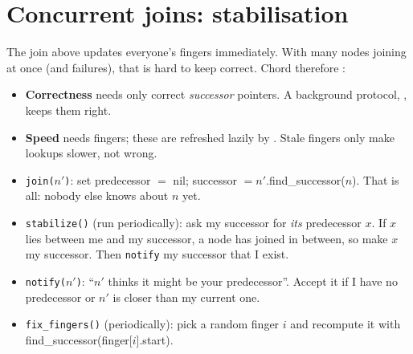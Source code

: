 \section{Concurrent joins: stabilisation}

The join above updates everyone's fingers immediately. With many nodes joining at once (and failures), that is hard to keep correct. Chord
therefore :
\begin{itemize}
  \item \textbf{Correctness} needs only correct \emph{successor} pointers. A background protocol, , keeps them right.
  \item \textbf{Speed} needs fingers; these are refreshed lazily by . Stale fingers only make lookups slower, not wrong.
\end{itemize}


\begin{itemize}
  \item \texttt{join($n'$)}: set predecessor $=$ nil; successor $= n'$.find\_successor($n$). That is all: nobody else knows about $n$ yet.
  \item \texttt{stabilize()} (run periodically): ask my successor for \emph{its} predecessor $x$. If $x$ lies between me and my successor, a node has
        joined in between, so make $x$ my successor. Then \texttt{notify} my successor that I exist.
  \item \texttt{notify($n'$)}: ``$n'$ thinks it might be your predecessor''. Accept it if I have no predecessor or $n'$ is closer than my current one.
  \item \texttt{fix\_fingers()} (periodically): pick a random finger $i$ and recompute it with find\_successor(finger[$i$].start).
\end{itemize}

